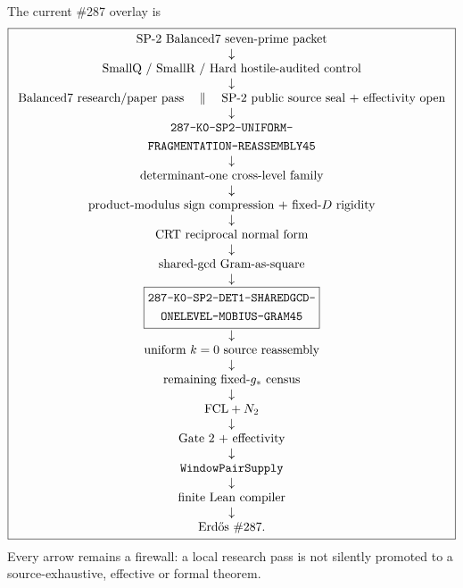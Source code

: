 \documentclass[11pt]{article}
\theoremstyle{definition}
\newcommand{\1}{\mathbf 1}
\begin{document}
The current \#287 overlay is
\[
\boxed{
\begin{array}{c}
\text{SP-2 Balanced7 seven-prime packet}\\
\downarrow\\
\text{SmallQ / SmallR / Hard hostile-audited control}\\
\downarrow\\
\text{Balanced7 research/paper pass}
\quad
\parallel
\quad
\text{SP-2 public source seal + effectivity open}\\
\downarrow\\
\begin{gathered}\texttt{287-K0-SP2-UNIFORM-}\\\texttt{FRAGMENTATION-REASSEMBLY45}\end{gathered}\\
\downarrow\\
\text{determinant-one cross-level family}\\
\downarrow\\
\text{product-modulus sign compression + fixed-}D\text{ rigidity}\\
\downarrow\\
\text{CRT reciprocal normal form}\\
\downarrow\\
\text{shared-gcd Gram-as-square}\\
\downarrow\\
\boxed{\begin{gathered}\texttt{287-K0-SP2-DET1-SHAREDGCD-}\\\texttt{ONELEVEL-MOBIUS-GRAM45}\end{gathered}}\\
\downarrow\\
\text{uniform }k=0\text{ source reassembly}\\
\downarrow\\
\text{remaining fixed-}g_*\text{ census}\\
\downarrow\\
\text{FCL}+N_2\\
\downarrow\\
\text{Gate 2 + effectivity}\\
\downarrow\\
\texttt{WindowPairSupply}\\
\downarrow\\
\text{finite Lean compiler}\\
\downarrow\\
\text{Erd\H{o}s \#287}.
\end{array}}
\]
Every arrow remains a firewall: a local research pass is not silently promoted to a
source-exhaustive, effective or formal theorem.
\end{document}
